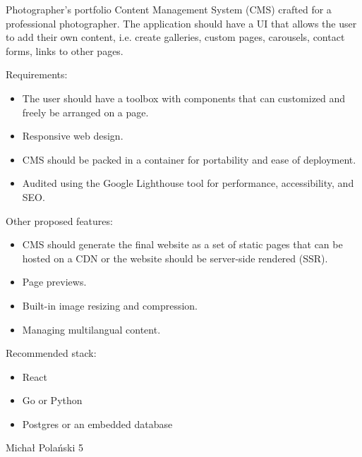 \begin{project}
{Photographer's portfolio}
{Content Management System (CMS) crafted for a professional photographer. The application should have a UI that allows the user to add their own content, i.e. create galleries, custom pages, carousels, contact forms, links to other pages.}
{
Requirements:
\begin{itemize}
	\item The user should have a toolbox with components that can customized and freely be arranged on a page.
	\item Responsive web design.
	\item CMS should be packed in a container for portability and ease of deployment.
	\item Audited using the Google Lighthouse tool for performance, accessibility, and SEO.
\end{itemize}
Other proposed features:
\begin{itemize}
	\item CMS should generate the final website as a set of static pages that can be hosted on a CDN or the website should be server-side rendered (SSR).
	\item Page previews.
	\item Built-in image resizing and compression.
	\item Managing multilangual content.
\end{itemize}
}
{
Recommended stack:
\begin{itemize}
	\item React
	\item Go or Python
	\item Postgres or an embedded database
\end{itemize}
}
{Michał Polański}
{5}
\end{project}
